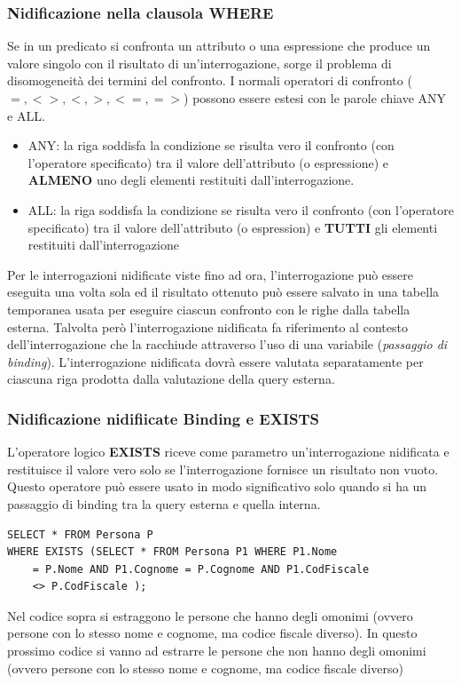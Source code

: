 \documentclass[a4paper]{article}
\begin{document}
\subsubsection{Nidificazione nella clausola WHERE}

Se in un predicato si confronta un attributo o una espressione che
produce un valore singolo con il risultato di un’interrogazione,
sorge il problema di disomogeneità dei termini del confronto.
I normali operatori di confronto ($=, <>, <, >, <=, =>$) possono
essere estesi con le parole chiave ANY e ALL.
\begin{itemize}
    \item ANY: la riga soddisfa la condizione se risulta vero il confronto (con
    l’operatore specificato) tra il valore dell’attributo (o espressione) e
    \textbf{ALMENO} uno degli elementi restituiti dall’interrogazione.
    \item ALL: la riga soddisfa la condizione se risulta vero il confronto (con
    l’operatore specificato) tra il valore dell’attributo (o espression) e
    \textbf{TUTTI} gli elementi restituiti dall’interrogazione
\end{itemize}
\noindent
Per le interrogazioni nidificate viste fino ad ora, l’interrogazione
può essere eseguita una volta sola ed il risultato ottenuto può
essere salvato in una tabella temporanea usata per eseguire
ciascun confronto con le righe dalla tabella esterna.
Talvolta però l’interrogazione nidificata fa riferimento al contesto
dell’interrogazione che la racchiude attraverso l’uso di una
variabile (\textit{passaggio di binding}).
L’interrogazione nidificata dovrà essere valutata separatamente
per ciascuna riga prodotta dalla valutazione della query esterna.

\subsubsection{Nidificazione nidifiicate Binding e EXISTS}

L’operatore logico \textbf{EXISTS} riceve come parametro
un’interrogazione nidificata e restituisce il valore vero solo se
l’interrogazione fornisce un risultato non vuoto.
Questo operatore può essere usato in modo significativo solo
quando si ha un passaggio di binding tra la query esterna e quella
interna.

\begin{verbatim}
SELECT * FROM Persona P
WHERE EXISTS (SELECT * FROM Persona P1 WHERE P1.Nome
    = P.Nome AND P1.Cognome = P.Cognome AND P1.CodFiscale
    <> P.CodFiscale );
\end{verbatim}
Nel codice sopra si estraggono le persone che hanno degli omonimi (ovvero
persone con lo stesso nome e cognome, ma codice fiscale
diverso).
In questo prossimo codice si vanno ad estrarre le persone che non hanno degli omonimi (ovvero
persone con lo stesso nome e cognome, ma codice fiscale
diverso)
\end{document}
